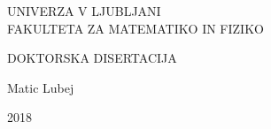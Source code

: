 \setcounter{page}{-9}
\begin{otherlanguage}{slovene}
\begin{center}
\pagestyle{empty}
{\large UNIVERZA V LJUBLJANI\\
FAKULTETA ZA MATEMATIKO IN FIZIKO
}

%
%
%

\vspace{10cm}
{\huge DOKTORSKA DISERTACIJA}



\vfill

{\hfill \large Matic Lubej}

\vspace{1cm}
{\large 2018}

\cleardoublepage

\end{center}
\end{otherlanguage}

